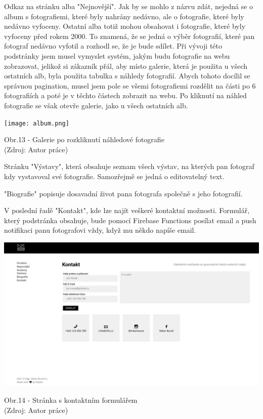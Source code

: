 \documentclass[12pt,a4paper]{report}
\begin{document}
  Odkaz na stránku alba "Nejnovější". 
  Jak by se mohlo z názvu zdát, nejedná se o album s fotografiemi, které byly nahrány nedávno, ale 
  o fotografie, které byly nedávno vyfoceny. Ostatní alba totiž mohou obsahovat i fotografie, které byly
  vyfoceny před rokem 2000. To znamená, že se
  jedná o výběr fotografií, které pan fotograf nedávno vyfotil a rozhodl se, že je bude sdílet. Při
  vývoji této podstránky jsem musel vymyslet systém, jakým budu fotografie na webu zobrazovat,
  jelikož si zákazník přál, aby místo galerie, která je použita u všech ostatních alb, byla použita
  tabulka s náhledy fotografií. Abych tohoto docílil se správnou pagination, musel jsem pole
  se všemi fotografiemi rozdělit na části po 6 fotografiích a poté je v těchto částech zobrazit na
  webu. Po kliknutí na náhled fotografie se však otevře galerie, jako u všech ostatních alb.
  
  \vspace*{0.5cm}
  \noindent\texttt{[image: album.png]}
  \begin{center}
    Obr.13 - Galerie po rozkliknutí náhledové fotografie  \\
    (Zdroj: Autor práce)
  \end{center}
  \vspace*{0.5cm}
 
  Stránku "Výstavy", která obsahuje seznam všech výstav, na kterých pan fotograf kdy vystavoval
  své fotografie. Samozřejmě se jedná o editovatelný text.
  
  "Biografie" popisuje dosavadní život pana fotografa společně s jeho fotografií.
  
  V poslední řadě "Kontakt", kde lze najít veškeré kontaktní možnosti. Formulář, který podstránka
  obsahuje, bude pomocí Firebase Functions posílat email a push notifikaci panu fotografovi vždy,
  když mu někdo napíše email.

  \vspace*{0.5cm}
  \noindent\includegraphics[width=\linewidth]{contact.png}
  \begin{center}
    Obr.14 -  Stránka s kontaktním formulářem \\
    (Zdroj: Autor práce)
  \end{center}
  \vspace*{0.5cm}
\end{document}
